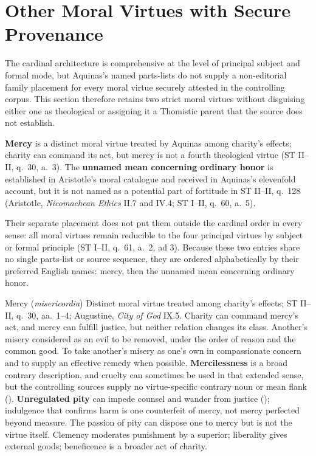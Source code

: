 \section{Other Moral Virtues with Secure Provenance}
\label{sec:other-moral}

The cardinal architecture is comprehensive at the level of principal subject and formal mode, but Aquinas's named parts-lists do not supply a non-editorial family placement for every moral virtue securely attested in the controlling corpus. This section therefore retains two strict moral virtues without disguising either one as theological or assigning it a Thomistic parent that the source does not establish.

\textbf{Mercy} is a distinct moral virtue treated by Aquinas among charity's effects; charity can command its act, but mercy is not a fourth theological virtue (ST II--II, q.~30, a.~3). The \textbf{unnamed mean concerning ordinary honor} is established in Aristotle's moral catalogue and received in Aquinas's elevenfold account, but it is not named as a potential part of fortitude in ST II--II, q.~128 (Aristotle, \emph{Nicomachean Ethics} II.7 and IV.4; ST I--II, q.~60, a.~5).

Their separate placement does not put them outside the cardinal order in every sense: all moral virtues remain reducible to the four principal virtues by subject or formal principle (ST I--II, q.~61, a.~2, ad 3). Because these two entries share no single parts-list or source sequence, they are ordered alphabetically by their preferred English names: mercy, then the unnamed mean concerning ordinary honor.

\virtuedossier
  {Mercy (\emph{misericordia})}
  {Distinct moral virtue treated among charity's effects; ST II--II, q.~30, aa.~1--4; Augustine, \emph{City of God} IX.5. Charity can command mercy's act, and mercy can fulfill justice, but neither relation changes its class.}
  {Another's misery considered as an evil to be removed, under the order of reason and the common good.}
  {To take another's misery as one's own in compassionate concern and to supply an effective remedy when possible.}
  {\textbf{Mercilessness} is a broad contrary description, and cruelty can sometimes be used in that extended sense, but the controlling sources supply no virtue-specific contrary noun or mean flank ().}
  {\textbf{Unregulated pity} can impede counsel and wander from justice (); indulgence that confirms harm is one counterfeit of mercy, not mercy perfected beyond measure.}
  {The passion of pity can dispose one to mercy but is not the virtue itself. Clemency moderates punishment by a superior; liberality gives external goods; beneficence is a broader act of charity.}

